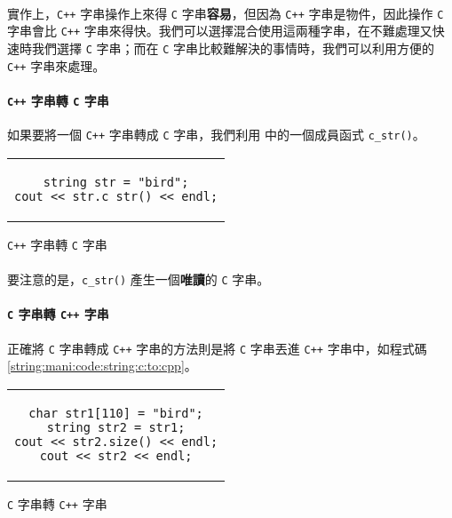 \documentclass[12pt,a4paper,oneside]{report}
\begin{document}
\begin{CJK}{UTF8}{bkai}
\paragraph{}實作上，\texttt{C++} 字串操作上來得 \texttt{C} 字串\textbf{容易}，但因為 \texttt{C++} 字串是物件，因此操作 \texttt{C} 字串會比 \texttt{C++} 字串來得快。我們可以選擇混合使用這兩種字串，在不難處理又快速時我們選擇 \texttt{C} 字串；而在 \texttt{C} 字串比較難解決的事情時，我們可以利用方便的 \texttt{C++} 字串來處理。

\paragraph{\texttt{C++} 字串轉 \texttt{C} 字串}如果要將一個 \texttt{C++} 字串轉成 \texttt{C} 字串，我們利用  中的一個成員函式 \lstinline!c_str()!。

\begin{code}[h!]
  \centering
  \begin{tabular}{c}
  \begin{lstlisting}
string str = "bird";
cout << str.c_str() << endl;
  \end{lstlisting}
  \end{tabular}
  \caption{\texttt{C++} 字串轉 \texttt{C} 字串}
  \label{string:mani:code:string:cpp:to:c}
\end{code}

\paragraph{}要注意的是，\lstinline!c_str()! 產生一個\textbf{唯讀}的 \texttt{C} 字串。
\paragraph{\texttt{C} 字串轉 \texttt{C++} 字串}正確將 \texttt{C} 字串轉成 \texttt{C++} 字串的方法則是將 \texttt{C} 字串丟進 \texttt{C++} 字串中，如程式碼 \ref{string:mani:code:string:c:to:cpp}。

\begin{code}[h!]
  \centering
  \begin{tabular}{c}
  \begin{lstlisting}
char str1[110] = "bird";
string str2 = str1;
cout << str2.size() << endl;
cout << str2 << endl;
  \end{lstlisting}
  \end{tabular}
  \caption{\texttt{C} 字串轉 \texttt{C++} 字串}
  \label{string:mani:code:string:c:to:cpp}
\end{code}


\end{CJK}
\end{document}
